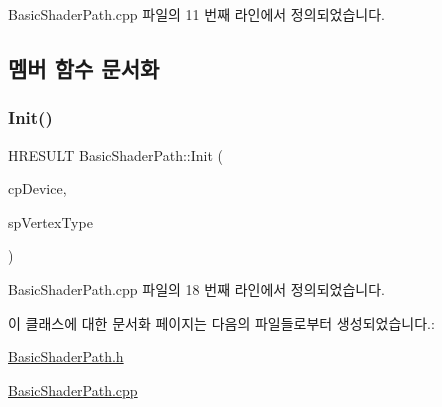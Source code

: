 Basic\+Shader\+Path.\+cpp 파일의 11 번째 라인에서 정의되었습니다.



\subsection{멤버 함수 문서화}
\mbox{\label{class_m_n_l_1_1_basic_shader_path_a5600873eea14db77383ef1781c393aa9}} 
\subsubsection{\texorpdfstring{Init()}{Init()}}
{\footnotesize\ttfamily H\+R\+E\+S\+U\+LT Basic\+Shader\+Path\+::\+Init (\begin{DoxyParamCaption}\item[{const \hyperlink{namespace_m_n_l_a1eec210db8f309a4a9ac0d9658784c31}{C\+P\+D3\+D\+Device} \&}]{cp\+Device,  }\item[{const std\+::shared\+\_\+ptr$<$ \hyperlink{class_m_n_l_1_1_mn_custom_vertex_type}{Mn\+Custom\+Vertex\+Type} $>$ \&}]{sp\+Vertex\+Type }\end{DoxyParamCaption})}



Basic\+Shader\+Path.\+cpp 파일의 18 번째 라인에서 정의되었습니다.



이 클래스에 대한 문서화 페이지는 다음의 파일들로부터 생성되었습니다.\+:\begin{DoxyCompactItemize}
\item 
\hyperlink{_basic_shader_path_8h}{Basic\+Shader\+Path.\+h}\item 
\hyperlink{_basic_shader_path_8cpp}{Basic\+Shader\+Path.\+cpp}\end{DoxyCompactItemize}
